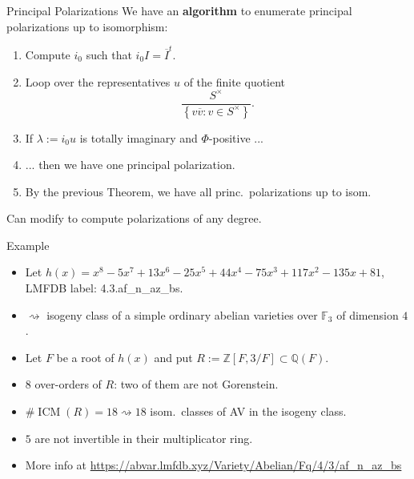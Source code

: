 \documentclass[usenames,dvipsnames]{beamer}
\def\Q{\mathbb{Q}}
\def\Z{\mathbb{Z}}
\def\F{\mathbb{F}}
\DeclareMathOperator{\ICM}{ICM}
\newcommand{\set}[1]{\left\lbrace#1\right\rbrace }
\begin{document}
\begin{frame}{Principal Polarizations}
    We have an {\bf algorithm} to enumerate principal polarizations up to isomorphism:
\pause
    \begin{enumerate}
    \item Compute $i_0$ such that $i_0 I = \overline{I}^t$.
\pause
    \item Loop over the representatives $u$ of the finite quotient
    \[ \frac{S^\times}{\set{v\overline{v}: v\in S^\times}}. \]
\pause    
    \item If $\lambda:=i_0 u$ is totally imaginary and $\Phi$-positive ...
\pause    
    \item ... then we have one principal polarization.
\pause    
    \item By the previous Theorem, we have all princ.~polarizations up to isom.
    \end{enumerate}
\pause 
    Can modify to compute polarizations of any degree.
\end{frame}

\begin{frame}{Example}
	\begin{itemize}
    \item Let $h(x)=x^8 - 5x^7 + 13x^6 - 25x^5 + 44x^4 - 75x^3 + 117x^2 - 135x + 81$, LMFDB label: 4.3.af\_n\_az\_bs.
\pause
    \item $\rightsquigarrow$ isogeny class of a simple ordinary abelian varieties over $\F_{3}$ of dimension $4$.
\pause
    \item Let $F$ be a root of $h(x)$ and put $R:=\Z[F,3/F]\subset \Q(F)$.
\pause
    \item $8$ over-orders of $R$: two of them are not Gorenstein.
\pause
    \item $\#\ICM(R) = 18 \rightsquigarrow 18$ isom.~classes of AV in the isogeny class.
\pause
    \item $5$ are not invertible in their multiplicator ring.
\pause
    \item More info at {\footnotesize \url{https://abvar.lmfdb.xyz/Variety/Abelian/Fq/4/3/af_n_az_bs}}
	\end{itemize}
\end{frame}
\end{document}
